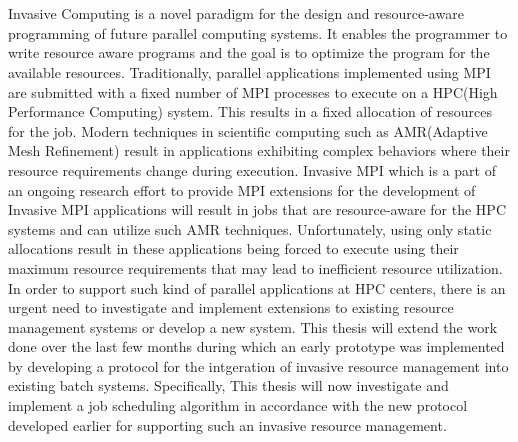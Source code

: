\chapter{\abstractname}
Invasive Computing is a novel paradigm for the design and resource-aware programming of future parallel computing systems. It enables the programmer to write resource aware programs and the goal is to optimize the program for the available resources. Traditionally, parallel applications implemented using MPI are submitted with a fixed number of MPI processes to execute on a HPC(High Performance Computing) system. This results in a fixed allocation of resources for the job. Modern techniques in scientific computing such as AMR(Adaptive Mesh Refinement) result in applications exhibiting complex behaviors where their resource requirements change during execution. Invasive MPI which is a part of an ongoing research effort to provide MPI extensions for the development of Invasive MPI applications will result in jobs that are resource-aware for the HPC systems and can utilize such AMR techniques. Unfortunately, using only static allocations result in these applications being forced to execute using their maximum resource requirements that may lead to inefficient resource utilization. In order to support such kind of parallel applications at HPC centers, there is an urgent need to investigate and implement extensions to existing resource management systems or develop a new system. This thesis will extend the work done over the last few months during which an early prototype was implemented by developing a protocol for the intgeration of invasive resource management into existing batch systems. Specifically, This thesis will now investigate and implement a job scheduling algorithm in accordance with the new protocol developed earlier for supporting such an invasive resource management.\par



